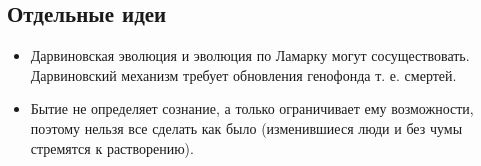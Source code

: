 \documentclass[12pt,a4paper]{article}
\begin{document}
\subsection*{Отдельные идеи}
\begin{itemize}
\item Дарвиновская эволюция и эволюция по Ламарку могут сосуществовать. Дарвиновский механизм требует обновления генофонда т. е. смертей.
\item Бытие не определяет сознание, а только ограничивает ему возможности, поэтому нельзя все сделать как было (изменившиеся люди и без чумы стремятся к растворению).
\end{itemize}
\end{document}
